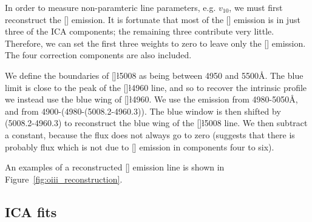 In order to measure non-paramteric line parameters, e.g. $v_{10}$, we must first reconstruct the [] emission. 
It is fortunate that most of the [] emission is in just three of the \ac{ICA} components; the remaining three contribute very little. 
Therefore, we can set the first three weights to zero to leave only the [] emission. 
The four correction components are also included. 

We define the boundaries of []\l5008 as being between 4950 and 5500\AA. 
The blue limit is close to the peak of the []\l4960 line, and so to recover the intrinsic profile we instead use the blue wing of []\l4960. 
We use the emission from 4980-5050\AA, and from 4900-(4980-(5008.2-4960.3)). 
The blue window is then shifted by (5008.2-4960.3) to reconstruct the blue wing of the []\l5008 line. 
We then subtract a constant, because the flux does not always go to zero (suggests that there is probably flux which is not due to [] emission in components four to six). 

An examples of a reconstructed [] emission line is shown in Figure~\ref{fig:oiii_reconstruction}. 

\subsection{\ac{ICA} fits}

